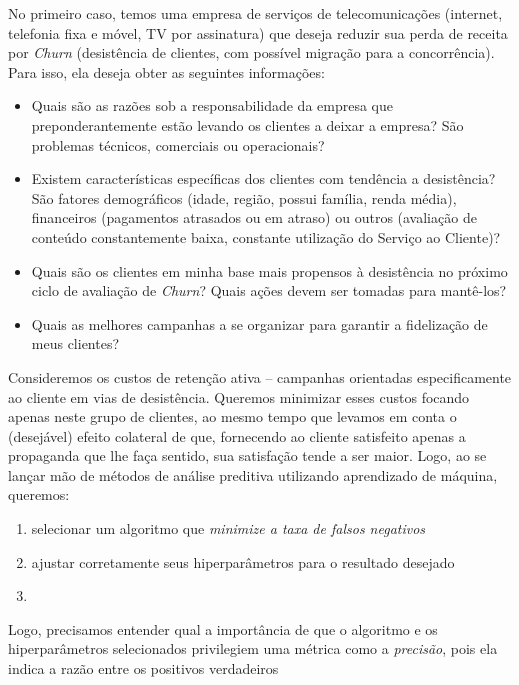 \documentclass[]{article}
\begin{document}
No primeiro caso, temos uma empresa de serviços de telecomunicações
(internet, telefonia fixa e móvel, TV por assinatura) que deseja reduzir
sua perda de receita por \emph{Churn} (desistência de clientes, com
possível migração para a concorrência). Para isso, ela deseja obter as
seguintes informações:

\begin{itemize}
\item
  Quais são as razões sob a responsabilidade da empresa que
  preponderantemente estão levando os clientes a deixar a empresa? São
  problemas técnicos, comerciais ou operacionais?
\item
  Existem características específicas dos clientes com tendência a
  desistência? São fatores demográficos (idade, região, possui família,
  renda média), financeiros (pagamentos atrasados ou em atraso) ou
  outros (avaliação de conteúdo constantemente baixa, constante
  utilização do Serviço ao Cliente)?
\item
  Quais são os clientes em minha base mais propensos à desistência no
  próximo ciclo de avaliação de \emph{Churn}? Quais ações devem ser
  tomadas para mantê-los?
\item
  Quais as melhores campanhas a se organizar para garantir a fidelização
  de meus clientes?
\end{itemize}

Consideremos os custos de retenção ativa -- campanhas orientadas
especificamente ao cliente em vias de desistência. Queremos minimizar
esses custos focando apenas neste grupo de clientes, ao mesmo tempo que
levamos em conta o (desejável) efeito colateral de que, fornecendo ao
cliente satisfeito apenas a propaganda que lhe faça sentido, sua
satisfação tende a ser maior. Logo, ao se lançar mão de métodos de
análise preditiva utilizando aprendizado de máquina, queremos:

\begin{enumerate}
\def\labelenumi{\arabic{enumi}.}
\item
  selecionar um algoritmo que \emph{minimize a taxa de falsos negativos}
\item
  ajustar corretamente seus hiperparâmetros para o resultado desejado
\item
\end{enumerate}

Logo, precisamos entender qual a importância de que o algoritmo e os
hiperparâmetros selecionados privilegiem uma métrica como a
\emph{precisão}, pois ela indica a razão entre os positivos verdadeiros
\end{document}
